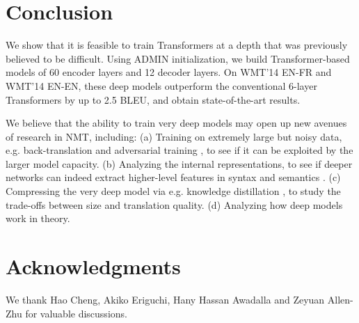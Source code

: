 \documentclass[11pt,a4paper]{article}
\begin{document}
\section{Conclusion}
\label{sec:conclusion}
We show that it is feasible to train Transformers at a depth that was previously believed to be difficult. 
Using ADMIN initialization, we build Transformer-based models of 60 encoder layers and 12 decoder layers. On WMT'14 EN-FR and WMT'14 EN-EN, these deep models outperform the conventional 6-layer Transformers by up to 2.5 BLEU, and obtain state-of-the-art results.

We believe that the ability to train very deep models may open up new avenues of research in NMT, including:
(a) Training on extremely large but noisy data, e.g. back-translation \cite{edunov2018back-nmt} and adversarial training \cite{cheng2019robust,liu2020alum}, to see if it can be exploited by the larger model capacity. 
(b) Analyzing the internal representations, to see if deeper networks can indeed extract higher-level features in syntax and semantics \cite{belinkov19}. (c) Compressing the very deep model via e.g. knowledge distillation \cite{kim-rush-2016-sequence}, to study the trade-offs between size and translation quality. (d) Analyzing how deep models work \cite{allen2020backward} in theory. \section*{Acknowledgments}
We thank Hao Cheng, Akiko Eriguchi, Hany Hassan Awadalla and Zeyuan Allen-Zhu for valuable discussions. 
 

\end{document}

